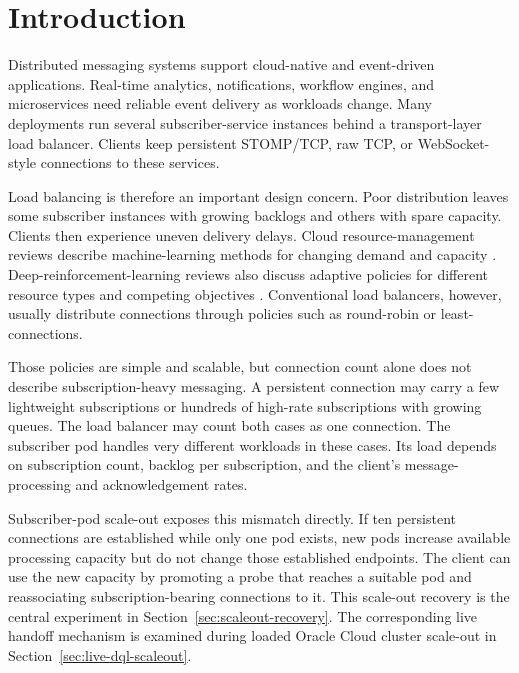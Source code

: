 \documentclass[manuscript]{acmart}
\begin{document}

\maketitle
\raggedbottom

\section{Introduction}

Distributed messaging systems support cloud-native and event-driven applications. Real-time analytics, notifications, workflow engines, and microservices need reliable event delivery as workloads change. Many deployments run several subscriber-service instances behind a transport-layer load balancer. Clients keep persistent STOMP/TCP, raw TCP, or WebSocket-style connections to these services.

Load balancing is therefore an important design concern. Poor distribution leaves some subscriber instances with growing backlogs and others with spare capacity. Clients then experience uneven delivery delays. Cloud resource-management reviews describe machine-learning methods for changing demand and capacity \cite{Khan2022MLCloudReview}. Deep-reinforcement-learning reviews also discuss adaptive policies for different resource types and competing objectives \cite{Zhou2024DRLCloudReview}. Conventional load balancers, however, usually distribute connections through policies such as round-robin or least-connections.

Those policies are simple and scalable, but connection count alone does not describe subscription-heavy messaging. A persistent connection may carry a few lightweight subscriptions or hundreds of high-rate subscriptions with growing queues. The load balancer may count both cases as one connection. The subscriber pod handles very different workloads in these cases. Its load depends on subscription count, backlog per subscription, and the client's message-processing and acknowledgement rates.

Subscriber-pod scale-out exposes this mismatch directly. If ten persistent
connections are established while only one pod exists, new pods increase
available processing capacity but do not change those established endpoints.
The client can use the new capacity by promoting a probe that reaches a
suitable pod and reassociating subscription-bearing connections to it. This
scale-out recovery is the central experiment in Section~\ref{sec:scaleout-recovery}.
The corresponding live handoff mechanism is examined during loaded Oracle
Cloud cluster scale-out in Section~\ref{sec:live-dql-scaleout}.
\end{document}
